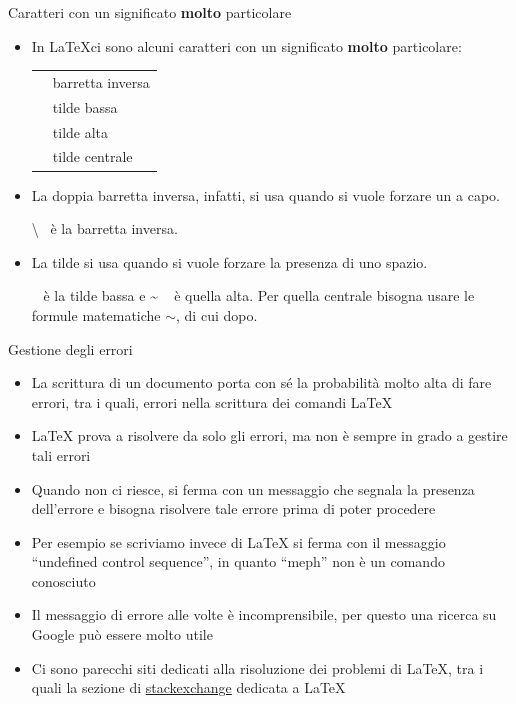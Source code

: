 \documentclass{beamer}
\begin{document}
\begin{frame}[fragile]{\centerline{Caratteri con un significato \textbf{molto} particolare}}
\small
\begin{itemize}

\item In \LaTeX ci sono  alcuni caratteri con un significato \textbf{molto} particolare:\\[1ex]
\begin{tabular}{cl}
\keystrokebftt{\textbackslash} & barretta inversa              \\
\keystrokebftt{\texttildelow} & tilde bassa \\
\keystrokebftt{\textasciitilde} & tilde alta \\
\keystrokebftt{$\sim$} & tilde centrale \\
\end{tabular}
\item La doppia barretta inversa, infatti, si usa quando si vuole forzare un a capo.
\begin{exampletwoup}
\textbackslash ~ \`{e}
la barretta inversa.
\end{exampletwoup}
\item La tilde si usa quando si vuole forzare la presenza di uno spazio.
\begin{exampletwoup}
\texttildelow ~ \`{e}
la tilde bassa e \textasciitilde
~ \`{e} quella alta. Per quella
centrale bisogna usare le formule
matematiche $\sim$, di cui dopo.
\end{exampletwoup}
\end{itemize}
\end{frame}


\begin{frame}[fragile]{\centerline{Gestione degli errori}}
\begin{itemize}
\item La scrittura di un documento porta con s\'{e} la probabilit\`{a} molto alta di fare errori, tra i quali, errori nella scrittura dei comandi \LaTeX{}
\item \LaTeX{} prova a risolvere da solo gli errori, ma non \`{e} sempre in grado a gestire tali errori
\item Quando non ci riesce, si ferma con un messaggio che segnala la presenza dell'errore e bisogna risolvere tale errore prima di poter procedere
\item Per esempio se scriviamo  invece di  \LaTeX{} si ferma con il messaggio ``undefined control sequence'', in quanto ``meph'' non \`{e} un comando conosciuto
\item Il messaggio di errore alle volte \`{e} incomprensibile, per questo una ricerca su Google pu\`{o} essere molto utile
\item Ci sono parecchi siti dedicati alla risoluzione dei problemi di  \LaTeX{}, tra i quali la sezione di \href{https://tex.stackexchange.com}{stackexchange} dedicata a  \LaTeX{}
\end{itemize}
\end{frame}
\end{document}
